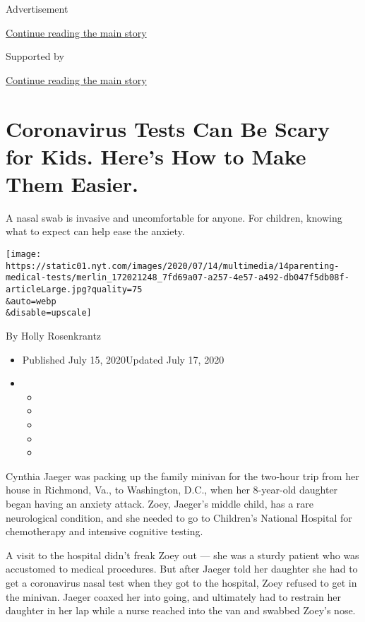 Advertisement

\protect\hyperlink{after-top}{Continue reading the main story}

Supported by

\protect\hyperlink{after-sponsor}{Continue reading the main story}

\hypertarget{coronavirus-tests-can-be-scary-for-kids-heres-how-to-make-them-easier}{%
\section{Coronavirus Tests Can Be Scary for Kids. Here's How to Make
Them
Easier.}\label{coronavirus-tests-can-be-scary-for-kids-heres-how-to-make-them-easier}}

A nasal swab is invasive and uncomfortable for anyone. For children,
knowing what to expect can help ease the anxiety.

\texttt{[image: https://static01.nyt.com/images/2020/07/14/multimedia/14parenting-medical-tests/merlin\_172021248\_7fd69a07-a257-4e57-a492-db047f5db08f-articleLarge.jpg?quality=75\\\&auto=webp\\\&disable=upscale]}

By Holly Rosenkrantz

\begin{itemize}
\item
  Published July 15, 2020Updated July 17, 2020
\item
  \begin{itemize}
  \item
  \item
  \item
  \item
  \item
  \end{itemize}
\end{itemize}

Cynthia Jaeger was packing up the family minivan for the two-hour trip
from her house in Richmond, Va., to Washington, D.C., when her
8-year-old daughter began having an anxiety attack. Zoey, Jaeger's
middle child, has a rare neurological condition, and she needed to go to
Children's National Hospital for chemotherapy and intensive cognitive
testing.

A visit to the hospital didn't freak Zoey out --- she was a sturdy
patient who was accustomed to medical procedures. But after Jaeger told
her daughter she had to get a coronavirus nasal test when they got to
the hospital, Zoey refused to get in the minivan. Jaeger coaxed her into
going, and ultimately had to restrain her daughter in her lap while a
nurse reached into the van and swabbed Zoey's nose.

